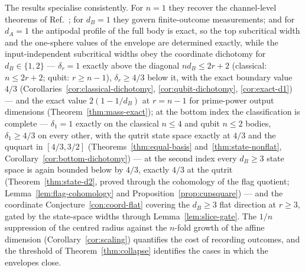 \documentclass[11pt,a4paper]{article}
\begin{document}
The results specialise consistently. For $n=1$ they recover the channel-level theorems of Ref.~\cite{CompanionChannels}; for $d_B=1$ they govern finite-outcome measurements; and for $d_A=1$ the antipodal profile of the full body is exact, so the top subcritical width and the one-sphere values of the envelope are determined exactly, while the input-independent subcritical widths obey the coordinate dichotomy for $d_B\in\{1,2\}$ --- $\delta_r=1$ exactly above the diagonal $nd_B\le2r+2$ (classical: $n\le2r+2$; qubit: $r\ge n-1$), $\delta_r\ge4/3$ below it, with the exact boundary value $4/3$ (Corollaries~\ref{cor:classical-dichotomy}, \ref{cor:qubit-dichotomy}, \ref{cor:exact-d1}) --- and the exact value $2(1-1/d_B)$ at $r=n-1$ for prime-power output dimensions (Theorem~\ref{thm:mass-exact}); at the bottom index the classification is complete --- $\delta_1=1$ exactly on the classical $n\le4$ and qubit $n\le2$ bodies, $\delta_1\ge4/3$ on every other, with the qutrit state space exactly at $4/3$ and the ququart in $[4/3,3/2]$ (Theorems~\ref{thm:equal-basis} and~\ref{thm:state-nonflat}, Corollary~\ref{cor:bottom-dichotomy}) --- at the second index every $d_B\ge3$ state space is again bounded below by $4/3$, exactly $4/3$ at the qutrit (Theorem~\ref{thm:state-d2}, proved through the cohomology of the flag quotient; Lemma~\ref{lem:flag-cohomology} and Proposition~\ref{prop:cupsquare}) --- and the coordinate Conjecture~\ref{con:coord-flat} covering the $d_B\ge3$ flat direction at $r\ge3$, gated by the state-space widths through Lemma~\ref{lem:slice-gate}. The $1/n$ suppression of the centred radius against the $n$-fold growth of the affine dimension (Corollary~\ref{cor:scaling}) quantifies the cost of recording outcomes, and the threshold of Theorem~\ref{thm:collapse} identifies the cases in which the envelopes close.
\end{document}
